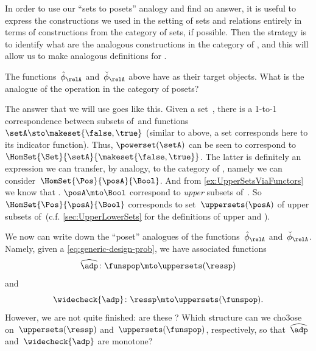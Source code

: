 In order to use our ``sets to posets'' analogy and find an answer, it is useful to express the constructions we used in the setting of sets and relations entirely in terms of constructions from the category of sets, if possible.
Then the strategy is to identify what are the analogous constructions in the category of , and this will allow us to make analogous definitions for .

The functions~$\hat \phi_{\relA}$ and~$\check \phi_{\relA}$ above have  as their target objects.
What is the analogue of the  operation in the category of posets?

The answer that we will use goes like this.
Given a set~\setA, there is a 1-to-1 correspondence between subsets of~\setA and functions~$\setA \sto \makeset{ \false, \true }$ (similar to above, a set corresponds here to its indicator function).
Thus, $\powerset (\setA)$ can be seen to correspond to~$\HomSet{\Set}{\setA}{\makeset{ \false, \true}}$.
The latter is definitely an expression we can transfer, by analogy, to the category of , namely we can consider~$\HomSet{\Pos}{\posA}{\Bool}$.
And from \cref{ex:UpperSetsViaFunctors} we know that .
$\posA \mto \Bool$ correspond to \emph{upper} subsets of~\posA.
So~$\HomSet{\Pos}{\posA}{\Bool}$ corresponds to set~$\uppersets (\posA)$ of upper subsets of~\posA (c.f.
\cref{sec:UpperLowerSets} for the definitions of upper and ).

We now can write down the ``poset'' analogues of the functions~$\hat \phi_{\relA}$ and~$\check \phi_{\relA}$.
Namely, given a  \cref{eq:generic-design-prob}, we have associated functions
\begin{equation}
    \label{eq:dp-left-curry}
    \widehat{\adp} \colon \funspop \mto \uppersets  (\ressp)
\end{equation}
and
\begin{equation}
    \label{eq:dp-right-curry}
    \widecheck{\adp} \colon \ressp \mto \uppersets (\funspop).
\end{equation}
However, we are not quite finished: are these ?
Which  structure can we cho3ose on~$\uppersets (\ressp)$ and~$\uppersets (\funspop)$, respectively, so that~$\widehat{\adp}$ and~$\widecheck{\adp}$ are monotone?

